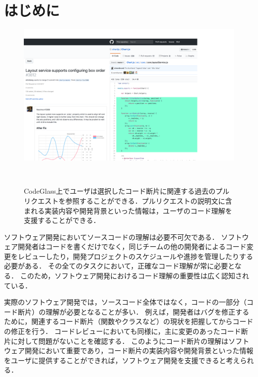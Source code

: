 \section{はじめに}

\begin{figure}[!b]
\centering
\includegraphics[width=1.2\columnwidth]{interface/top_image.png}
\caption{CodeGlass上でユーザは選択したコード断片に関連する過去のプルリクエストを参照することができる．プルリクエストの説明文に含まれる実装内容や開発背景といった情報は，ユーザのコード理解を支援することができる．}
~\label{fig:top}
\end{figure}

ソフトウェア開発においてソースコードの理解は必要不可欠である．
ソフトウェア開発者はコードを書くだけでなく，同じチームの他の開発者によるコード変更をレビューしたり，開発プロジェクトのスケジュールや進捗を管理したりする必要がある．
その全てのタスクにおいて，正確なコード理解が常に必要となる．
このため，ソフトウェア開発におけるコード理解の重要性は広く認知されている．





実際のソフトウェア開発では，ソースコード全体ではなく，コードの一部分（コード断片）の理解が必要となることが多い．
例えば，開発者はバグを修正するために，関連するコード断片（関数やクラスなど）の現状を把握してからコードの修正を行う．
コードレビューにおいても同様に，主に変更のあったコード断片に対して問題がないことを確認する．
このようにコード断片の理解はソフトウェア開発において重要であり，コード断片の実装内容や開発背景といった情報をユーザに提供することができれば，ソフトウェア開発を支援できると考えられる．


